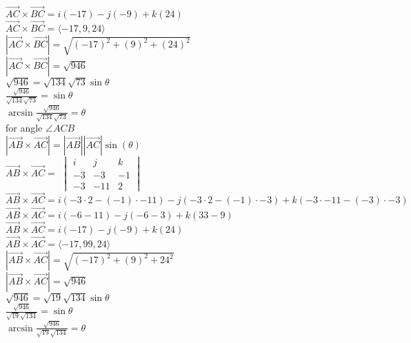 \documentclass{article}
\begin{document}
\\[0.1in]$\vec{AC} \times \vec{BC} = i(-17)-j(-9)+k(24)$
\\[0.1in]$\vec{AC} \times \vec{BC} = \langle-17,9,24\rangle$
\\[0.1in]$|\vec{AC} \times \vec{BC}| = \sqrt{(-17)^2+(9)^2+(24)^2}$
\\[0.1in]$|\vec{AC} \times \vec{BC}| = \sqrt{946}$
\\[0.1in]$\sqrt{946} = \sqrt{134}\sqrt{73}\sin\theta$
\\[0.1in]$\frac{\sqrt{946}}{\sqrt{134}\sqrt{73}} = \sin\theta$
\\[0.1in]$\arcsin\frac{\sqrt{946}}{\sqrt{134}\sqrt{73}} = \theta$
\\[0.1in]\boxed{\theta = 18.12\degree} for angle $\angle ACB$
\\[0.1in]$|\vec{AB}\times \vec{AC}|=|\vec{AB}||\vec{AC}|\sin(\theta)$
\\[0.1in]$\vec{AB} \times \vec{AC} = $
$\begin{vmatrix}
i & j & k \\
-3 & -3 & -1 \\
-3 & -11 & 2
\end{vmatrix}$
\\[0.1in]$\vec{AB} \times \vec{AC} = i(-3\cdot2-(-1)\cdot -11)-j(-3\cdot 2-(-1)\cdot -3)+k(-3\cdot-11-(-3)\cdot -3)$
\\[0.1in]$\vec{AB} \times \vec{AC} = i(-6-11)-j(-6-3)+k(33-9)$
\\[0.1in]$\vec{AB} \times \vec{AC} = i(-17)-j(-9)+k(24)$
\\[0.1in]$\vec{AB} \times \vec{AC} = \langle-17,99,24\rangle$
\\[0.1in]$|\vec{AB} \times \vec{AC}| = \sqrt{(-17)^2+(9)^2+24^2}$
\\[0.1in]$|\vec{AB} \times \vec{AC}| = \sqrt{946}$
\\[0.1in]$\sqrt{946}=\sqrt{19}\sqrt{134}\sin\theta$
\\$\frac{\sqrt{946}}{\sqrt{19}\sqrt{134}}=\sin\theta$
\\$\arcsin\frac{\sqrt{946}}{\sqrt{19}\sqrt{134}}=\theta$
\\[0.1in]\boxed{\theta=37.56\degree}
\end{document}
